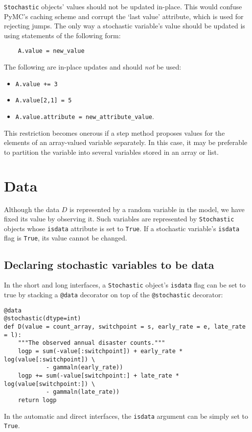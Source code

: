 \texttt{Stochastic} objects' values should not be updated in-place. This would confuse PyMC's caching scheme and corrupt the `last value' attribute, which is used for rejecting jumps. The only way a stochastic variable's value should be updated is using statements of the following form:
\begin{verbatim}
    A.value = new_value
\end{verbatim}
The following are in-place updates and should \emph{not} be used:
\begin{itemize}
    \item \texttt{A.value += 3}
    \item \texttt{A.value[2,1] = 5}
    \item \texttt{A.value.attribute = new_attribute_value}.
\end{itemize}

This restriction becomes onerous if a step method proposes values for the elements of an array-valued variable separately. In this case, it may be preferable to partition the variable into several variables stored in an array or list.

\hypertarget{data}{}
\section*{Data} \label{data}

Although the data $D$ is represented by a random variable in the model, we have fixed its value by observing it. Such variables are represented by \texttt{Stochastic} objects whose \texttt{isdata} attribute is set to \texttt{True}. If a stochastic variable's \texttt{isdata} flag is \texttt{True}, its value cannot be changed.

\subsection*{Declaring stochastic variables to be data}

In the short and long interfaces, a \texttt{Stochastic} object's \texttt{isdata} flag can be set to true by stacking a \texttt{@data} decorator on top of the \texttt{@stochastic} decorator:
\begin{verbatim}
@data
@stochastic(dtype=int)
def D(value = count_array, switchpoint = s, early_rate = e, late_rate = l):
    """The observed annual disaster counts."""
    logp = sum(-value[:switchpoint]) + early_rate * log(value[:switchpoint]) \
            - gammaln(early_rate))
    logp += sum(-value[switchpoint:] + late_rate * log(value[switchpoint:]) \
            - gammaln(late_rate))
    return logp
\end{verbatim}
In the automatic and direct interfaces, the \texttt{isdata} argument can be simply set to \texttt{True}.


